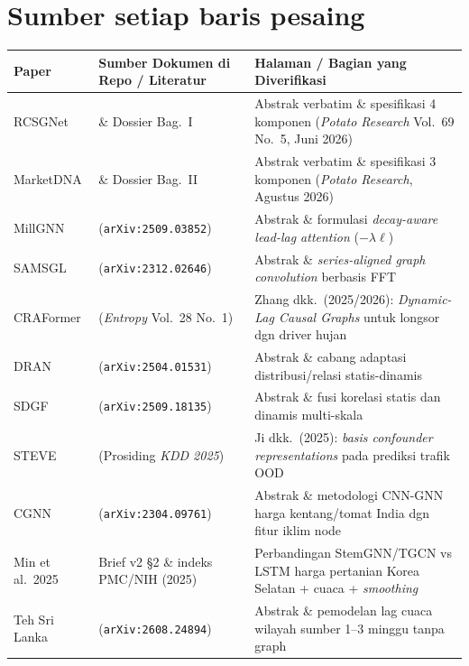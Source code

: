 \documentclass[11pt,a4paper]{article}
\begin{document}
\section{Sumber setiap baris pesaing}
\begin{table}[H]
\centering
\footnotesize
\begin{tabular}{@{}L{2.8cm}L{5.8cm}L{5.6cm}@{}}
\toprule
Paper & Sumber Dokumen di Repo / Literatur & Halaman / Bagian yang Diverifikasi \\
\midrule
RCSGNet &  \& Dossier Bag.\ I & Abstrak verbatim \& spesifikasi 4 komponen (\emph{Potato Research} Vol.\ 69 No.\ 5, Juni 2026) \\
MarketDNA &  \& Dossier Bag.\ II & Abstrak verbatim \& spesifikasi 3 komponen (\emph{Potato Research}, Agustus 2026) \\
MillGNN &  (\texttt{arXiv:2509.03852}) & Abstrak \& formulasi \emph{decay-aware lead-lag attention} ($-\lambda\ell$) \\
SAMSGL &  (\texttt{arXiv:2312.02646}) & Abstrak \& \emph{series-aligned graph convolution} berbasis FFT \\
CRAFormer &  (\emph{Entropy} Vol.\ 28 No.\ 1) & Zhang dkk.\ (2025/2026): \emph{Dynamic-Lag Causal Graphs} untuk longsor dgn driver hujan \\
DRAN &  (\texttt{arXiv:2504.01531}) & Abstrak \& cabang adaptasi distribusi/relasi statis-dinamis \\
SDGF &  (\texttt{arXiv:2509.18135}) & Abstrak \& fusi korelasi statis dan dinamis multi-skala \\
STEVE &  (Prosiding \emph{KDD 2025}) & Ji dkk.\ (2025): \emph{basis confounder representations} pada prediksi trafik OOD \\
CGNN &  (\texttt{arXiv:2304.09761}) & Abstrak \& metodologi CNN-GNN harga kentang/tomat India dgn fitur iklim node \\
Min et al.\ 2025 & Brief v2 \S2 \& indeks PMC/NIH (2025) & Perbandingan StemGNN/TGCN vs LSTM harga pertanian Korea Selatan + cuaca + \emph{smoothing} \\
Teh Sri Lanka &  (\texttt{arXiv:2608.24894}) & Abstrak \& pemodelan lag cuaca wilayah sumber 1--3 minggu tanpa graph \\
\bottomrule
\end{tabular}
\end{table}
\end{document}
